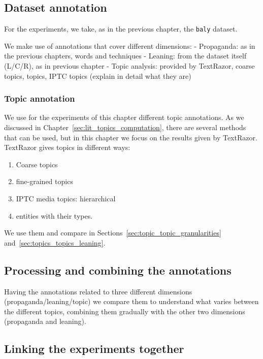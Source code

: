 \subsection{Dataset annotation}

For the experiments, we take, as in the previous chapter, the \texttt{baly} dataset.

We make use of annotations that cover different dimensions:
- Propaganda: as in the previous chapters, words and techniques
- Leaning: from the dataset itself (L/C/R), as in previous chapter
- Topic analysis: provided by TextRazor, coarse topics, topics, IPTC topics (explain in detail what they are)


\subsubsection{Topic annotation}
We use for the experiments of this chapter different topic annotations. As we discussed in Chapter~\ref{sec:lit_topics_computation}, there are several methods that can be used, but in this chapter we focus on the results given by TextRazor.
TextRazor gives topics in different ways:

\begin{enumerate}
    \item Coarse topics
    \item fine-grained topics
    \item IPTC media topics: hierarchical
    \item entities with their types.
\end{enumerate}

We use them and compare in Sections~\ref{sec:topic_topic_granularities} and~\ref{sec:topics_topics_leaning}.

\subsection{Processing and combining the annotations}

Having the annotations related to three different dimensions (propaganda/leaning/topic) we compare them to understand what varies between the different topics, combining them gradually with the other two dimensions (propaganda and leaning).



\subsection{Linking the experiments together}

